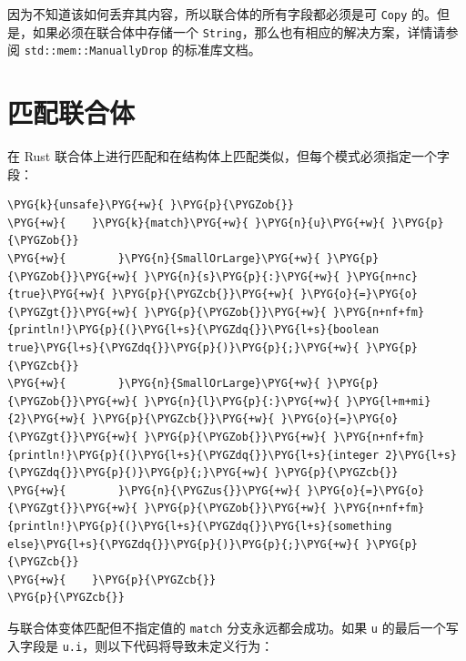因为不知道该如何丢弃其内容，所以联合体的所有字段都必须是可 \texttt{Copy} 的。但是，如果必须在联合体中存储一个 \texttt{String}，那么也有相应的解决方案，详情请参阅 \texttt{std::mem::ManuallyDrop} 的标准库文档。

\section{匹配联合体}

在 Rust 联合体上进行匹配和在结构体上匹配类似，但每个模式必须指定一个字段：

\begin{Verbatim}[commandchars=\\\{\},breaklines=true,breakanywhere=true,fontsize=\codefont,xleftmargin=17bp]
\PYG{k}{unsafe}\PYG{+w}{ }\PYG{p}{\PYGZob{}}
\PYG{+w}{    }\PYG{k}{match}\PYG{+w}{ }\PYG{n}{u}\PYG{+w}{ }\PYG{p}{\PYGZob{}}
\PYG{+w}{        }\PYG{n}{SmallOrLarge}\PYG{+w}{ }\PYG{p}{\PYGZob{}}\PYG{+w}{ }\PYG{n}{s}\PYG{p}{:}\PYG{+w}{ }\PYG{n+nc}{true}\PYG{+w}{ }\PYG{p}{\PYGZcb{}}\PYG{+w}{ }\PYG{o}{=}\PYG{o}{\PYGZgt{}}\PYG{+w}{ }\PYG{p}{\PYGZob{}}\PYG{+w}{ }\PYG{n+nf+fm}{println!}\PYG{p}{(}\PYG{l+s}{\PYGZdq{}}\PYG{l+s}{boolean true}\PYG{l+s}{\PYGZdq{}}\PYG{p}{)}\PYG{p}{;}\PYG{+w}{ }\PYG{p}{\PYGZcb{}}
\PYG{+w}{        }\PYG{n}{SmallOrLarge}\PYG{+w}{ }\PYG{p}{\PYGZob{}}\PYG{+w}{ }\PYG{n}{l}\PYG{p}{:}\PYG{+w}{ }\PYG{l+m+mi}{2}\PYG{+w}{ }\PYG{p}{\PYGZcb{}}\PYG{+w}{ }\PYG{o}{=}\PYG{o}{\PYGZgt{}}\PYG{+w}{ }\PYG{p}{\PYGZob{}}\PYG{+w}{ }\PYG{n+nf+fm}{println!}\PYG{p}{(}\PYG{l+s}{\PYGZdq{}}\PYG{l+s}{integer 2}\PYG{l+s}{\PYGZdq{}}\PYG{p}{)}\PYG{p}{;}\PYG{+w}{ }\PYG{p}{\PYGZcb{}}
\PYG{+w}{        }\PYG{n}{\PYGZus{}}\PYG{+w}{ }\PYG{o}{=}\PYG{o}{\PYGZgt{}}\PYG{+w}{ }\PYG{p}{\PYGZob{}}\PYG{+w}{ }\PYG{n+nf+fm}{println!}\PYG{p}{(}\PYG{l+s}{\PYGZdq{}}\PYG{l+s}{something else}\PYG{l+s}{\PYGZdq{}}\PYG{p}{)}\PYG{p}{;}\PYG{+w}{ }\PYG{p}{\PYGZcb{}}
\PYG{+w}{    }\PYG{p}{\PYGZcb{}}
\PYG{p}{\PYGZcb{}}
\end{Verbatim}

与联合体变体匹配但不指定值的 \texttt{match} 分支永远都会成功。如果 \texttt{u} 的最后一个写入字段是 \texttt{u.i}，则以下代码将导致未定义行为：

